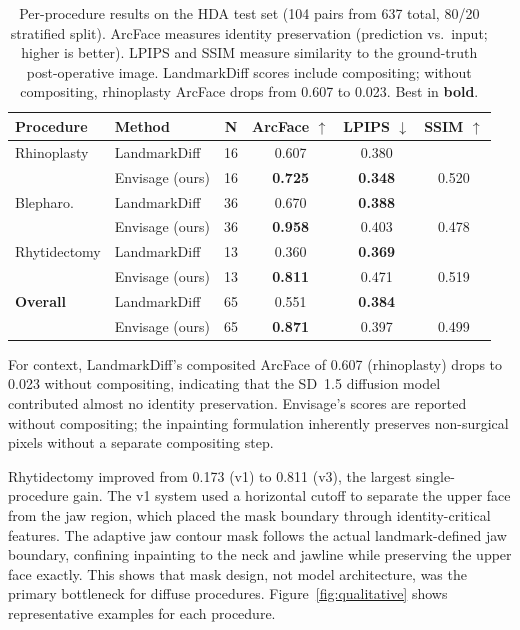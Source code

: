\documentclass[runningheads]{llncs}
\newcommand{\method}{Envisage}
\newcommand{\best}[1]{\textbf{#1}}
\begin{document}
\begin{table}[t]
\centering
\caption{Per-procedure results on the HDA test set (104 pairs from
637 total, 80/20 stratified split). ArcFace measures identity preservation
(prediction vs.\ input; higher is better). LPIPS and SSIM measure
similarity to the ground-truth post-operative image. LandmarkDiff scores
include compositing; without compositing, rhinoplasty ArcFace drops from
0.607 to 0.023. Best in \textbf{bold}.}
\label{tab:main_results}
\begin{tabular}{@{}llcccc@{}}
\toprule
\textbf{Procedure} & \textbf{Method} & \textbf{N} &
\textbf{ArcFace} $\uparrow$ & \textbf{LPIPS} $\downarrow$ &
\textbf{SSIM} $\uparrow$ \\
\midrule
Rhinoplasty  & LandmarkDiff         & 16 & 0.607          & 0.380          &       \\
             & \method{} (ours)     & 16 & \best{0.725}   & \best{0.348}   & 0.520 \\
\midrule
Blepharo.    & LandmarkDiff         & 36 & 0.670          & \best{0.388}   &       \\
             & \method{} (ours)     & 36 & \best{0.958}   & 0.403          & 0.478 \\
\midrule
Rhytidectomy & LandmarkDiff         & 13 & 0.360          & \best{0.369}   &       \\
             & \method{} (ours)     & 13 & \best{0.811}   & 0.471          & 0.519 \\
\midrule
\textbf{Overall} & LandmarkDiff     & 65 & 0.551         & \best{0.384}   &       \\
                 & \method{} (ours) & 65 & \best{0.871}  & 0.397          & 0.499 \\
\bottomrule
\end{tabular}
\end{table}

For context, LandmarkDiff's composited ArcFace of 0.607 (rhinoplasty)
drops to 0.023 without compositing, indicating that the SD~1.5 diffusion
model contributed almost no identity preservation. \method{}'s scores
are reported without compositing; the inpainting formulation inherently
preserves non-surgical pixels without a separate compositing step.

Rhytidectomy improved from 0.173 (v1) to 0.811 (v3), the largest
single-procedure gain. The v1 system used a horizontal cutoff to separate
the upper face from the jaw region, which placed the mask boundary through
identity-critical features. The adaptive jaw contour mask follows the
actual landmark-defined jaw boundary, confining inpainting to the neck and
jawline while preserving the upper face exactly. This shows that
mask design, not model architecture, was the primary bottleneck for
diffuse procedures. Figure~\ref{fig:qualitative} shows representative
examples for each procedure.
\end{document}
